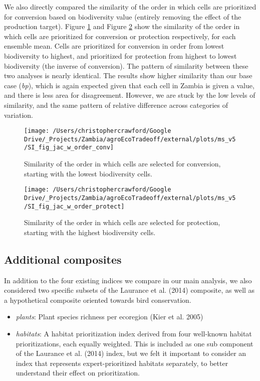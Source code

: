 \documentclass[
]{article}
\begin{document}
We also directly compared the similarity of the order in which cells are prioritized for conversion based on biodiversity value (entirely removing the effect of the production target). Figure \ref{fig:order-conv} and Figure \ref{fig:order-protect} show the similarity of the order in which cells are prioritized for conversion or protection respectively, for each ensemble mean. Cells are prioritized for conversion in order from lowest biodiversity to highest, and prioritized for protection from highest to lowest biodiversity (the inverse of conversion). The pattern of similarity between these two analyses is nearly identical. The results show higher similarity than our base case (\emph{bp}), which is again expected given that each cell in Zambia is given a value, and there is less area for disagreement. However, we are stuck by the low levels of similarity, and the same pattern of relative difference across categories of variation.





\begin{figure}
\texttt{[image: /Users/christophercrawford/Google Drive/\_Projects/Zambia/agroEcoTradeoff/external/plots/ms\_v5/SI\_fig\_jac\_w\_order\_conv]} \caption{Similarity of the order in which cells are selected for conversion, starting with the lowest biodiversity cells.}\label{fig:order-conv}
\end{figure}

\begin{figure}
\texttt{[image: /Users/christophercrawford/Google Drive/\_Projects/Zambia/agroEcoTradeoff/external/plots/ms\_v5/SI\_fig\_jac\_w\_order\_protect]} \caption{Similarity of the order in which cells are selected for protection, starting with the highest biodiversity cells.}\label{fig:order-protect}
\end{figure}

\newpage

\hypertarget{additional-composites}{%
\subsection{Additional composites}\label{additional-composites}}

In addition to the four existing indices we compare in our main analysis, we also considered two specific subsets of the Laurance et al. (2014) composite, as well as a hypothetical composite oriented towards bird conservation.

\begin{itemize}
\item
  \emph{plants}: Plant species richness per ecoregion (Kier et al. 2005)
\item
  \emph{habitats}: A habitat prioritization index derived from four well-known habitat prioritizations, each equally weighted. This is included as one sub component of the Laurance et al. (2014) index, but we felt it important to consider an index that represents expert-prioritized habitats separately, to better understand their effect on prioritization.
\end{itemize}
\end{document}
